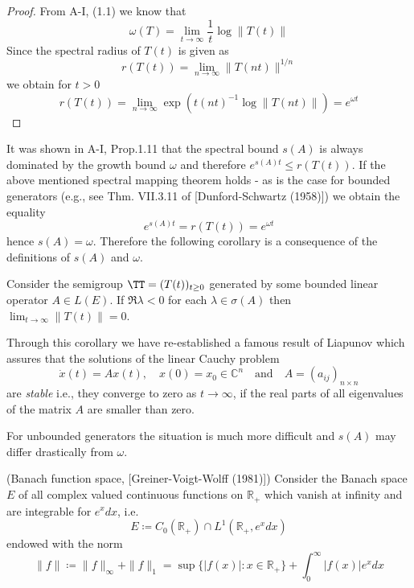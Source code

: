\begin{proof}
From A-I, (1.1) we know that
\[ 
    \omega(T) = \lim_{t \to \infty} \frac{1}{t} \log \|T(t)\|
\]
Since the spectral radius of $T(t)$ is given as
\[
    r(T(t)) = \lim_{n \to \infty} \|T(nt)\|^{1/n}
\]
we obtain for $t > 0$
\[
    r(T(t)) = \lim_{n \to \infty} \exp(t(nt)^{-1} \log \|T(nt)\|) = e^{\omega t}
\]
\end{proof}

It was shown in A-I, Prop.1.11 that the spectral bound $s(A)$ is always dominated by the growth bound $\omega$ and therefore $e^{s(A)t} \leq r(T(t))$.
If the above mentioned spectral mapping theorem holds - as is the case for bounded generators (e.g., see Thm. VII.3.11 of [Dunford-Schwartz (1958)]) we obtain the equality
\[
    e^{s(A)t} = r(T(t)) = e^{\omega t}
\]
hence $s(A) = \omega$.
Therefore the following corollary is a consequence of the definitions of $s(A)$ and $\omega$.
\begin{corollary}\label{cor:a3-1.2}
Consider the semigroup $\TT = (T(t))_{t \geq 0}$ generated by some bounded linear operator $A \in L(E)$.
If $\Re\lambda < 0$ for each $\lambda \in \sigma(A)$ then $\lim_{t \to \infty}\|T(t)\| = 0$.
\end{corollary}

Through this corollary we have re-established a famous result of Liapunov which assures that the solutions of the linear Cauchy problem
\[
    \dot{x}(t) = Ax(t), \quad x(0) = x_{0} \in \mathbb{C}^{n} \quad \text{and} \quad A = (a_{ij})_{n\times n}
\]
are \emph{stable} i.e., they converge to zero as $t \to \infty$, if the real parts of all eigenvalues of the matrix $A$ are smaller than zero.

For unbounded generators the situation is much more difficult and $s(A)$ may differ drastically from $\omega$.
\begin{example}\label{ex:a3-1.3}
(Banach function space, [Greiner-Voigt-Wolff (1981)])
Consider the Banach space $E$ of all complex valued continuous functions on $\mathbb{R}_{+}$ which vanish at infinity and are integrable for $e^{x}dx$, i.e.
\[
    E \coloneqq C_{0}(\mathbb{R}_{+}) \cap L^{1}(\mathbb{R}_{+}, e^{x}dx)
\]
endowed with the norm
\[
    \|f\| \coloneqq \|f\|_{\infty} + \|f\|_{1} = \sup\{|f(x)| : x \in \mathbb{R}_{+}\} + \int_{0}^{\infty} |f(x)|e^{x} dx
\]
\end{example}


\newpage

